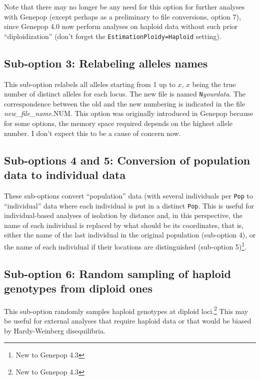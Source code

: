 \documentclass[12pt,]{book}
\let\rmarkdownfootnote\footnote%
\def\footnote{\protect\rmarkdownfootnote}
\theoremstyle{definition}
\theoremstyle{definition}
\theoremstyle{definition}
\theoremstyle{remark}
\begin{document}
Note that there may no longer be any need for this option for further
analyses with Genepop (except perhaps as a preliminary to file
conversions, option 7), since Genepop 4.0 now perform analyses on
haploid data without such prior ``diploidization'' (don't forget the
\texttt{EstimationPloidy=Haploid} setting).

\subsection{Sub-option 3: Relabeling alleles
names}\label{sub-option-3-relabeling-alleles-names}

 This sub-option relabels all alleles starting
from 1 up to \(x\), \(x\) being the true number of distinct alleles for
each locus. The new file is named \texttt{N}\emph{yourdata}. The
correspondence between the old and the new numbering is indicated in the
file \emph{new\_file\_name}.NUM. This option was originally introduced
in Genepop because for some options, the memory space required depends
on the highest allele number. I don't expect this to be a cause of
concern now.

\subsection{Sub-options 4 and 5: Conversion of population data to
individual
data}\label{sub-options-4-and-5-conversion-of-population-data-to-individual-data}

 These
sub-options convert ``population'' data (with several individuals per
\texttt{Pop} to ``individual'' data where each individual is put in a
distinct \texttt{Pop}. This is useful for individual-based analyses of
isolation by distance and, in this perspective, the name of each
individual is replaced by what should be its coordinates, that is,
either the name of the last individual in the original population
(sub-option 4), or the name of each individual if their locations are
distinguished (sub-option 5)\footnote{New to Genepop 4.3}.

\subsection{Sub-option 6: Random sampling of haploid genotypes from
diploid
ones}\label{sub-option-6-random-sampling-of-haploid-genotypes-from-diploid-ones}

This sub-option randomly samples haploid genotypes at diploid
loci.\footnote{New to Genepop 4.3} This may be useful for external
analyses that require haploid data or that would be biased by
Hardy-Weinberg disequilibria.
\end{document}
